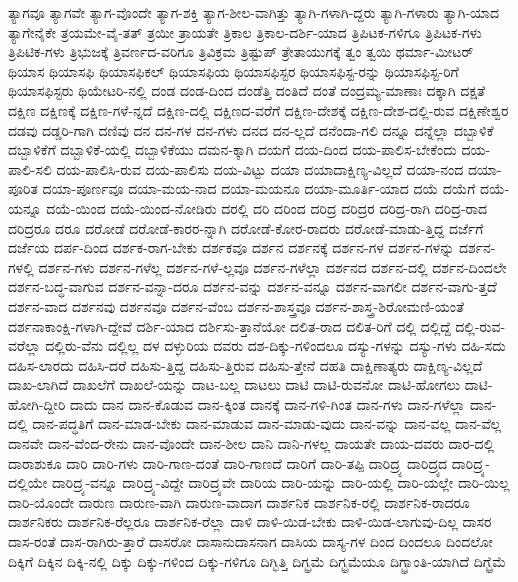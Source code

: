 {ತ್ಯಾಗವೂ
ತ್ಯಾಗವೇ
ತ್ಯಾಗ-ವೊಂದೇ
ತ್ಯಾಗ-ಶಕ್ತಿ
ತ್ಯಾಗ-ಶೀಲ-ವಾಗಿತ್ತು
ತ್ಯಾಗಿ-ಗಳಾಗಿ-ದ್ದರು
ತ್ಯಾಗಿ-ಗಳಾರು
ತ್ಯಾಗಿ-ಯಾದ
ತ್ಯಾಗೇನೈಕೇ
ತ್ರಯಮೇ-ವೈ-ತತ್
ತ್ರಯೀ
ತ್ರಾಯತೇ
ತ್ರಿಕಾಲ
ತ್ರಿಕಾಲ-ದರ್ಶಿ-ಯಾದ
ತ್ರಿಪಿಟಕ-ಗಳಿಗೂ
ತ್ರಿಪಿಟಕ-ಗಳು
ತ್ರಿಪಿಟಿಕ-ಗಳು
ತ್ರಿಭುಜಕ್ಕೆ
ತ್ರಿವರ್ಣದ-ವರಿಗೂ
ತ್ರಿವಿಕ್ರಮ
ತ್ರಿಷ್ಟುಪ್
ತ್ರೇತಾಯುಗಕ್ಕೆ
ತ್ವಂ
ತ್ವಯಿ
ಥರ್ಮಾ-ಮೀಟರ್
ಥಿಯಾಸ
ಥಿಯಾಸಫಿ
ಥಿಯಾಸಫಿಕಲ್
ಥಿಯಾಸಫಿಯ
ಥಿಯಾಸಫಿಸ್ಟರ
ಥಿಯಾಸಫಿಸ್ಟ-ರನ್ನು
ಥಿಯಾಸಫಿಸ್ಟ-ರಿಗೆ
ಥಿಯಾಸಫಿಸ್ಟರು
ಥಿಯೇಟರಿ-ನಲ್ಲಿ
ದಂಡ
ದಂಡ-ದಿಂದ
ದಂಡೆತ್ತಿ
ದಂತಿದೆ
ದಂತೆ
ದಂದ್ರಮ್ಯ-ಮಾಣಾಃ
ದಕ್ಕಾಗಿ
ದಕ್ಷತೆ
ದಕ್ಷಿಣ
ದಕ್ಷಿಣಕ್ಕೆ
ದಕ್ಷಿಣ-ಗಳೆ-ನ್ನದೆ
ದಕ್ಷಿಣ-ದಲ್ಲಿ
ದಕ್ಷಿಣದ-ವರೆಗೆ
ದಕ್ಷಿಣ-ದೇಶಕ್ಕೆ
ದಕ್ಷಿಣ-ದೇಶ-ದಲ್ಲಿ-ರುವ
ದಕ್ಷಿಣೇಶ್ವರ
ದಡವು
ದಡ್ಡರಿ-ಗಾಗಿ
ದಣಿವು
ದನ
ದನ-ಗಳ
ದನ-ಗಳು
ದನದ
ದನ-ಲ್ಲದೆ
ದನೆಂದಾ-ಗಲಿ
ದನ್ನೂ
ದನ್ನೆಲ್ಲಾ
ದಬ್ಬಾಳಿಕೆ
ದಬ್ಬಾಳಿಕೆಗೆ
ದಬ್ಬಾಳಿಕೆ-ಯಲ್ಲಿ
ದಬ್ಬಾಳಿಕೆಯು
ದಮನ-ಕ್ಕಾಗಿ
ದಯಗೆ
ದಯ-ದಿಂದ
ದಯ-ಪಾಲಿಸ-ಬೇಕೆಂದು
ದಯ-ಪಾಲಿ-ಸಲಿ
ದಯ-ಪಾಲಿಸಿ-ರುವ
ದಯ-ಪಾಲಿಸು
ದಯ-ವಿಟ್ಟು
ದಯಾ
ದಯಾದಾಕ್ಷಿಣ್ಯ-ವಿಲ್ಲದೆ
ದಯಾ-ನಂದ
ದಯಾ-ಪೂರಿತ
ದಯಾ-ಪೂರ್ಣವೂ
ದಯಾ-ಮಯ-ನಾದ
ದಯಾ-ಮಯನೂ
ದಯಾ-ಮೂರ್ತಿ-ಯಾದ
ದಯೆ
ದಯೆಗೆ
ದಯೆ-ಯನ್ನೂ
ದಯೆ-ಯಿಂದ
ದಯೆ-ಯಿಂದ-ನೋಡಿರು
ದರಲ್ಲಿ
ದರಿ
ದರಿಂದ
ದರಿದ್ರ
ದರಿದ್ರರ
ದರಿದ್ರ-ರಾಗಿ
ದರಿದ್ರ-ರಾದ
ದರಿದ್ರರೂ
ದರೂ
ದರೋಡೆ
ದರೋಡೆ-ಕಾರರ-ನ್ನಾಗಿ
ದರೋಡೆ-ಕೋರ-ರಾದರು
ದರೋಡೆ-ಮಾಡು-ತ್ತಿದ್ದ
ದರ್ಜೆಗೆ
ದರ್ಜೆಯ
ದರ್ಪ-ದಿಂದ
ದರ್ಶಕ-ರಾಗ-ಬೇಕು
ದರ್ಶಕವೂ
ದರ್ಶನ
ದರ್ಶನಕ್ಕೆ
ದರ್ಶನ-ಗಳ
ದರ್ಶನ-ಗಳನ್ನು
ದರ್ಶನ-ಗಳಲ್ಲಿ
ದರ್ಶನ-ಗಳು
ದರ್ಶನ-ಗಳೆಲ್ಲ
ದರ್ಶನ-ಗಳೆ-ಲ್ಲವೂ
ದರ್ಶನ-ಗಳೆಲ್ಲಾ
ದರ್ಶನದ
ದರ್ಶನ-ದಲ್ಲಿ
ದರ್ಶನ-ದಿಂದಲೇ
ದರ್ಶನ-ಬದ್ಧ-ವಾಗುವ
ದರ್ಶನ-ವನ್ನಾ-ದರೂ
ದರ್ಶನ-ವನ್ನು
ದರ್ಶನ-ವನ್ನೂ
ದರ್ಶನ-ವಾಗಲೀ
ದರ್ಶನ-ವಾಗು-ತ್ತದೆ
ದರ್ಶನ-ವಾದ
ದರ್ಶನವು
ದರ್ಶನವೂ
ದರ್ಶನ-ವೆಂಬ
ದರ್ಶನ-ಶಾಸ್ತ್ರವೂ
ದರ್ಶನ-ಶಾಸ್ತ್ರ-ಶಿರೋಮಣಿ-ಯಂತೆ
ದರ್ಶನಾಕಾಂಕ್ಷಿ-ಗಳಾಗಿ-ದ್ದೇವೆ
ದರ್ಶಿ-ಯಾದ
ದರ್ಶಿಸು-ತ್ತಾನೆಯೋ
ದಲಿತ-ರಾದ
ದಲಿತ-ರಿಗೆ
ದಲ್ಲಿ
ದಲ್ಲಿದ್ದೆ
ದಲ್ಲಿ-ರುವ-ವರೆಲ್ಲಾ
ದಲ್ಲಿರು-ವೆನು
ದಲ್ಲಿಲ್ಲ
ದಳ
ದಳ್ಳುರಿಯ
ದವರು
ದಶ-ದಿಕ್ಕು-ಗಳಿಂದಲೂ
ದಸ್ಯು-ಗಳನ್ನು
ದಸ್ಯು-ಗಳು
ದಹಿ-ಸದು
ದಹಿಸ-ಲಾರದು
ದಹಿಸಿ-ದರೆ
ದಹಿಸು-ತ್ತಿದ್ದ
ದಹಿಸು-ತ್ತಿರುವ
ದಹಿಸು-ತ್ತೇನೆ
ದಹತಿ
ದಾಕ್ಷಿಣಾತ್ಯರು
ದಾಕ್ಷಿಣ್ಯ-ವಿಲ್ಲದೆ
ದಾಖ-ಲಾಗಿದೆ
ದಾಖಲೆಗೆ
ದಾಖಲೆ-ಯನ್ನು
ದಾಟ-ಬಲ್ಲ
ದಾಟಲು
ದಾಟಿ
ದಾಟಿ-ರುವನೋ
ದಾಟಿ-ಹೋಗಲು
ದಾಟಿ-ಹೋಗಿ-ದ್ದೀರಿ
ದಾದು
ದಾನ
ದಾನ-ಕೊಡುವ
ದಾನ-ಕ್ಕಿಂತ
ದಾನಕ್ಕೆ
ದಾನ-ಗಳಿ-ಗಿಂತ
ದಾನ-ಗಳು
ದಾನ-ಗಳೆಲ್ಲಾ
ದಾನ-ದಲ್ಲಿ
ದಾನ-ಪದ್ಧತಿಗೆ
ದಾನ-ಮಾಡ-ಬೇಕು
ದಾನ-ಮಾಡುವ
ದಾನ-ಮಾಡು-ವುದು
ದಾನ-ವನ್ನು
ದಾನ-ವಲ್ಲ
ದಾನ-ವೆಲ್ಲ
ದಾನವೇ
ದಾನ-ವೆಂದ-ರೇನು
ದಾನ-ವೊಂದೇ
ದಾನ-ಶೀಲ
ದಾನಿ
ದಾನಿ-ಗಳಲ್ಲ
ದಾಯತೇ
ದಾಯ-ದವರು
ದಾರ-ದಲ್ಲಿ
ದಾರಾಶುಕೂ
ದಾರಿ
ದಾರಿ-ಗಳು
ದಾರಿ-ಗಾಣ-ದಂತೆ
ದಾರಿ-ಗಾಣದೆ
ದಾರಿಗೆ
ದಾರಿ-ತಪ್ಪಿ
ದಾರಿದ್ರ್ಯ
ದಾರಿದ್ರ್ಯದ
ದಾರಿದ್ರ್ಯ-ದಲ್ಲಿಯೇ
ದಾರಿದ್ರ್ಯ-ವನ್ನೂ
ದಾರಿದ್ರ್ಯ-ವಿದ್ದೇ
ದಾರಿದ್ರ್ಯವೇ
ದಾರಿಯ
ದಾರಿ-ಯನ್ನು
ದಾರಿ-ಯಲ್ಲಿ
ದಾರಿ-ಯಲ್ಲೇ
ದಾರಿ-ಯಿಲ್ಲ
ದಾರಿ-ಯೊಂದೇ
ದಾರುಣ
ದಾರುಣ-ವಾಗಿ
ದಾರುಣ-ವಾದಾಗ
ದಾರ್ಶನಿಕ
ದಾರ್ಶನಿಕ-ರಲ್ಲಿ
ದಾರ್ಶನಿಕ-ರಾದರೂ
ದಾರ್ಶನಿಕರು
ದಾರ್ಶನಿಕ-ರೆಲ್ಲರೂ
ದಾರ್ಶನಿಕ-ರೆಲ್ಲಾ
ದಾಳಿ
ದಾಳಿ-ಯಿಡ-ಬೇಕು
ದಾಳಿ-ಯಿಡ-ಲಾಗುವು-ದಿಲ್ಲ
ದಾಸರ
ದಾಸ-ರಂತೆ
ದಾಸ-ರಾಗಿರು-ತ್ತಾರೆ
ದಾಸರೋ
ದಾಸಾನುದಾಸನಾಗ
ದಾಸಿಯ
ದಾಸ್ಯ-ಗಳ
ದಿಂದ
ದಿಂದಲೂ
ದಿಂದಲೋ
ದಿಕ್ಕಿಗೆ
ದಿಕ್ಕಿನ
ದಿಕ್ಕಿ-ನಲ್ಲಿ
ದಿಕ್ಕು
ದಿಕ್ಕು-ಗಳಿಂದ
ದಿಕ್ಕು-ಗಳಿಗೂ
ದಿಗ್ಭಿತ್ತಿ
ದಿಗ್ಭ್ರಮೆ
ದಿಗ್ಭ್ರಮೆಯೂ
ದಿಗ್ಭ್ರಾಂತಿ-ಯಾಗಿದೆ
ದಿಗ್ಭ್ರೆಮೆ
}
